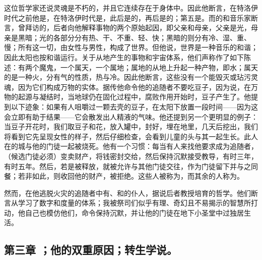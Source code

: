 这位哲学家还说灵魂是不朽的，并且它连续存在于身体中。因此他断言，在特洛伊时代之前他是，在特洛伊时代是，此后是的，再后是的；第五是。而的和音乐家断言，曾拜访的，后者向他解释事物的两个原始起因，即父亲和母亲，父亲是光，母亲是黑暗；光的各部分分有热、干、不重、轻、快；黑暗的则分有冷、湿、重、慢；所有这一切，由女性与男性，构成了世界。但他说，世界是一种音乐的和谐；因此太阳也按和谐运行。关于从地产生的事物和宇宙体系，他们声称作了如下陈述：有两个魔鬼，一个属天，一个属地；属地的从地上升起一种产物，即水；属天的是一种火，分有气的性质，热与冷。因此他断言，这些没有一个能毁灭或玷污灵魂，因为它们构成万物的实体。据传他命令他的追随者不要吃豆子，因为说，在万物的起源与凝结时，当地球仍在固化过程中，腐败作用开始时，豆子产生了。他提到以下迹象：如果有人咀嚼过一颗去壳的豆子，在太阳下放置一段时间——因为这会立即有助于结果——它会散发出人精液的气味。他还提到另一个更明显的例子：当豆子开花时，我们取豆子和花，放入罐中，封好，埋在地里，几天后挖出，我们将看到它先呈现女性的样子，然后仔细检查，会看到儿童的头与其一起生长。此人在的城与他的门徒一起被烧死。他有一个习惯：每当有人来找他要求成为追随者，（候选门徒必须）变卖财产，将钱密封交给，然后保持沉默接受教导，有时三年，有时五年。然后，若是被释放，就被允许与其他门徒交往，作为门徒留下并与之同餐；若非如此，则收回他的财产，被拒绝。这些人被称为，而其余的人称为。\par

然而，在他逃脱火灾的追随者中有、和的仆人，据说后者教授培育的哲学。他们断言从学习了数字和度量的体系；我被祭司们似乎有理、奇幻且不易揭示的智慧所打动，他自己也模仿他们，命令保持沉默，并让他的门徒在地下小圣堂中过独居生活。\par


\subsection{第三章 ；他的双重原因；转生学说。}

